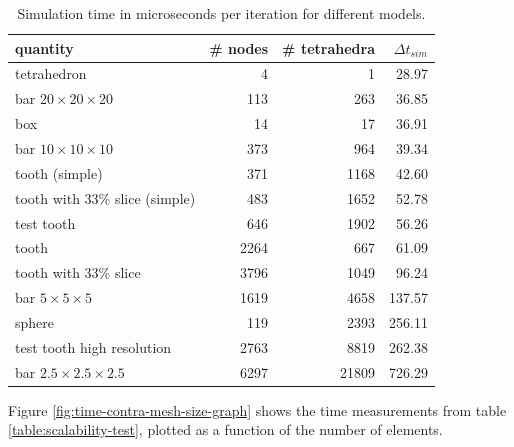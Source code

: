 \begin{table}
  \centering
  \begin{tabular}{|l|r|r|r|}
    \hline
    quantity & \# nodes & \# tetrahedra & $\Delta t_{sim}$ \\
    \hline
    tetrahedron                     &    4 &     1 &  28.97 \\
    bar $20 \times 20 \times 20$    &  113 &   263 &  36.85 \\
    box                             &   14 &    17 &  36.91 \\
    bar $10 \times 10 \times 10$    &  373 &   964 &  39.34 \\
    tooth (simple)                  &  371 &  1168 &  42.60 \\
    tooth with 33\% slice (simple)  &  483 &  1652 &  52.78 \\
    test tooth                      &  646 &  1902 &  56.26 \\
    tooth                           & 2264 &   667 &  61.09 \\
    tooth with 33\% slice           & 3796 &  1049 &  96.24 \\
    bar $5 \times 5 \times 5$       & 1619 &  4658 & 137.57 \\
    sphere                          &  119 &  2393 & 256.11 \\
    test tooth high resolution      & 2763 &  8819 & 262.38 \\
    bar $2.5 \times 2.5 \times 2.5$ & 6297 & 21809 & 726.29 \\
    \hline
  \end{tabular}
  \caption{Simulation time in microseconds per iteration for different models.}
  \label{table:scalability-test}
\end{table}


%
Figure \vref{fig:time-contra-mesh-size-graph} shows the time
measurements from table \vref{table:scalability-test}, plotted as a
function of the number of elements. 

